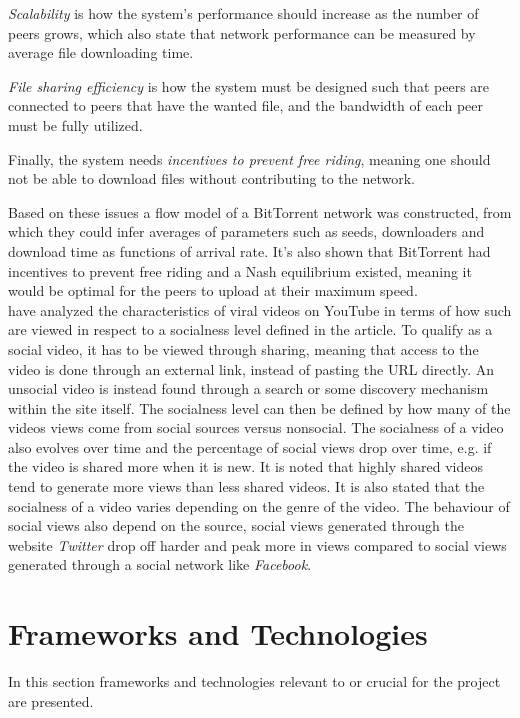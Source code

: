 \emph{Scalability} is how the system's performance should increase as the number of peers grows, which also state that network performance can be measured by average file downloading time.

\emph{File sharing efficiency} is how the system must be designed such that peers are connected to peers that have the wanted file, and the bandwidth of each peer must be fully utilized.

Finally, the system needs \emph{incentives to prevent free riding}, meaning one should not be able to download files without contributing to the network.

Based on these issues a flow model of a BitTorrent network was constructed, from which they could infer averages of parameters such as seeds, downloaders and download time as functions of arrival rate. It's also shown that BitTorrent had incentives to prevent free riding and a Nash equilibrium existed, meaning it would be optimal for the peers to upload at their maximum speed.
\\


\citet{broxton2013catching} have analyzed the characteristics of viral videos on YouTube in terms of how such are viewed in respect to a socialness level defined in the article. To qualify as a social video, it has to be viewed through sharing, meaning that access to the video is done through an external link, instead of pasting the URL directly. An unsocial video is instead found through a search or some discovery mechanism within the site itself. The socialness level can then be defined by how many of the videos views come from social sources versus nonsocial. The socialness of a video also evolves over time and the percentage of social views drop over time, e.g. if the video is shared more when it is new. It is noted that highly shared videos tend to generate more views than less shared videos. It is also stated that the socialness of a video varies depending on the genre of the video. The behaviour of social views also depend on the source, social views generated through the website \textit{Twitter} drop off harder and peak more in views compared to social views generated through a social network like \textit{Facebook}.


\section{Frameworks and Technologies}
\label{sec:fram-techn}
In this section frameworks and technologies relevant to or crucial for the project are presented.

